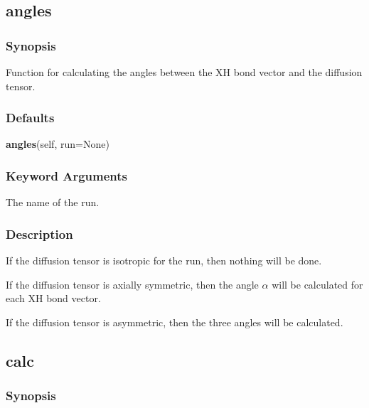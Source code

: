 

\newpage

\subsection{angles}


\subsubsection{Synopsis}

Function for calculating the angles between the XH bond vector and the diffusion tensor.



\subsubsection{Defaults}

\textsf{\textbf{angles}(self, run=None)}


\subsubsection{Keyword Arguments}

  The name of the run. 




\subsubsection{Description}

If the diffusion tensor is isotropic for the run, then nothing will be done.


If the diffusion tensor is axially symmetric, then the angle $\alpha$ will be calculated for each XH bond vector.


If the diffusion tensor is asymmetric, then the three angles will be calculated.




\newpage

\subsection{calc}


\subsubsection{Synopsis}


